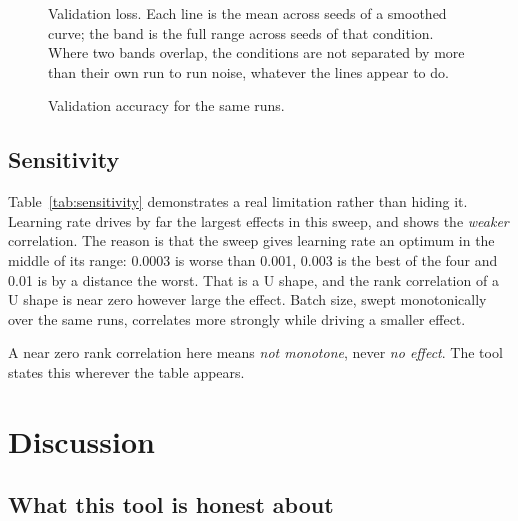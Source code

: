 \documentclass[11pt,a4paper]{report}
\begin{document}
\begin{figure}[htbp]
\centering

\caption{Validation loss. Each line is the mean across seeds of a smoothed curve;
the band is the full range across seeds of that condition. Where two bands
overlap, the conditions are not separated by more than their own run to run
noise, whatever the lines appear to do.}
\label{fig:loss}
\end{figure}

\begin{figure}[htbp]
\centering

\caption{Validation accuracy for the same runs.}
\label{fig:accuracy}
\end{figure}

\section{Sensitivity}

\begin{table}[htbp]
\centering
\small

\caption{Spearman rank correlation of each swept hyperparameter against each
metric, over all \factruns{} runs.}
\label{tab:sensitivity}
\end{table}

Table~\ref{tab:sensitivity} demonstrates a real limitation rather than hiding it.
Learning rate drives by far the largest effects in this sweep, and shows the
\emph{weaker} correlation. The reason is that the sweep gives learning rate an
optimum in the middle of its range: 0.0003 is worse than 0.001, 0.003 is the best
of the four and 0.01 is by a distance the worst. That is a U shape, and the rank
correlation of a U shape is near zero however large the effect. Batch size, swept
monotonically over the same runs, correlates more strongly while driving a
smaller effect.

A near zero rank correlation here means \emph{not monotone}, never \emph{no
effect}. The tool states this wherever the table appears.

\chapter{Discussion}
\label{ch:discussion}

\section{What this tool is honest about}
\end{document}
